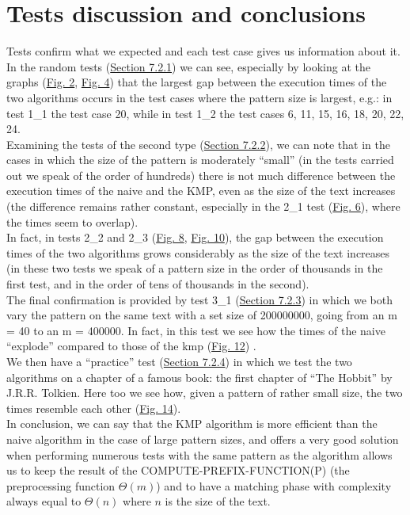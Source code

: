 \documentclass[11pt]{article}
\begin{document}
    \section{Tests discussion and conclusions} \label{sec:conclusions}

        Tests confirm what we expected and each test case gives us information about it. \\
        In the random tests (\hyperref[subsubsec:tests_1]{Section 7.2.1}) we can see, especially by looking at the graphs (\hyperref[fig:chart_test_1_1]{Fig. 2}, \hyperref[fig:chart_test_1_2]{Fig. 4}) that the largest gap between
        the execution times of the two algorithms occurs in the test cases where the pattern size is largest,
        e.g.: in test 1\_1 the test case 20, while in test 1\_2 the test cases 6, 11, 15, 16, 18, 20, 22, 24. \\
        Examining the tests of the second type (\hyperref[subsubsec:tests_2]{Section 7.2.2}), we can note that in the cases in which the size of the pattern is moderately ``small''
        (in the tests carried out we speak of the order of hundreds) there is not much difference between
        the execution times of the naive and the KMP, even as the size of the text increases (the difference remains rather constant,
        especially in the 2\_1 test (\hyperref[fig:chart_test_2_1]{Fig. 6}), where the times seem to overlap). \\
        In fact, in tests 2\_2 and 2\_3 (\hyperref[fig:chart_test_2_2]{Fig. 8}, \hyperref[fig:chart_test_2_3]{Fig. 10}), the gap between the execution times of the two algorithms grows considerably as the size of the text increases
        (in these two tests we speak of a pattern size in the order of thousands in the first test, and in the order of tens of thousands in the second). \\
        The final confirmation is provided by test 3\_1 (\hyperref[subsubsec:tests_3]{Section 7.2.3}) in which we both vary the pattern on the same text with a set size of 200000000,
        going from an m = 40 to an m = 400000. In fact, in this test we see how the times of the naive ``explode'' compared to those of the kmp (\hyperref[fig:chart_test_3_1]{Fig. 12}) . \\
        We then have a ``practice'' test (\hyperref[subsubsec:tests_4]{Section 7.2.4}) in which we test the two algorithms on a chapter of a famous book: the first chapter of ``The Hobbit'' by J.R.R. Tolkien.
        Here too we see how, given a pattern of rather small size, the two times resemble each other (\hyperref[fig:table_test_4_1]{Fig. 14}). \\

        \noindent In conclusion, we can say that the KMP algorithm is more efficient than the naive algorithm in the case of large pattern sizes,
        and offers a very good solution when performing numerous tests with the same pattern as the algorithm allows us to keep the result
        of the COMPUTE-PREFIX-FUNCTION(P) (the preprocessing function \pi {} $\Theta(m)$) and to have a matching phase with
        complexity always equal to $\Theta(n)$ where $n$ is the size of the text.

    \restoregeometry
\end{document}
